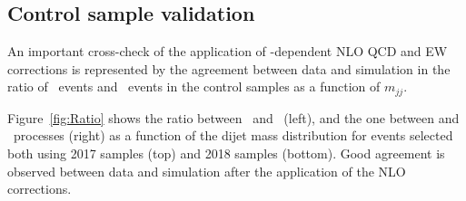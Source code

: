 \subsection{Control sample validation}

An important cross-check of the application of \pt-dependent NLO QCD and EW corrections
is represented by the agreement between data and simulation in the ratio of 
\Zjets~events and \Wjets~events in the control samples as a function of $m_{jj}$. 

Figure~\ref{fig:Ratio} shows the ratio between \Zmmjets~and \Wmnjets~(left), 
and the one between \Zeejets and \Wenjets~processes (right) as a function of the dijet mass distribution for 
events selected both using 2017 samples (top) and 2018 samples (bottom).
Good agreement is observed between data and simulation after the application of the NLO corrections. 

